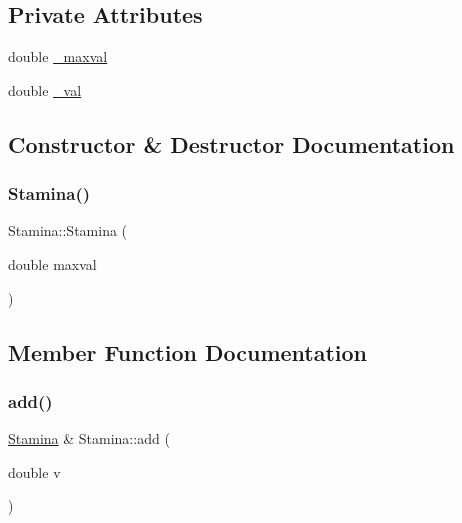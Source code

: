 \subsection*{Private Attributes}
\begin{DoxyCompactItemize}
\item 
double \hyperlink{classStamina_ada7872b81f23fee639afd0c1ab91ffa8_ada7872b81f23fee639afd0c1ab91ffa8}{\+\_\+maxval}
\item 
double \hyperlink{classStamina_a08f7cc6e531d019ab76269f8fdc1e8a3_a08f7cc6e531d019ab76269f8fdc1e8a3}{\+\_\+val}
\end{DoxyCompactItemize}


\subsection{Constructor \& Destructor Documentation}
\mbox{\label{classStamina_a90296cdf856dfd26d661c0bb57b02108_a90296cdf856dfd26d661c0bb57b02108}} 
\subsubsection{\texorpdfstring{Stamina()}{Stamina()}}
{\footnotesize\ttfamily Stamina\+::\+Stamina (\begin{DoxyParamCaption}\item[{double}]{maxval }\end{DoxyParamCaption})\hspace{0.3cm}{\ttfamily [explicit]}}



\subsection{Member Function Documentation}
\mbox{\label{classStamina_afc204ffdbeb2696f031dc68a08c7330c_afc204ffdbeb2696f031dc68a08c7330c}} 
\subsubsection{\texorpdfstring{add()}{add()}}
{\footnotesize\ttfamily \hyperlink{classStamina}{Stamina} \& Stamina\+::add (\begin{DoxyParamCaption}\item[{double}]{v }\end{DoxyParamCaption})}


